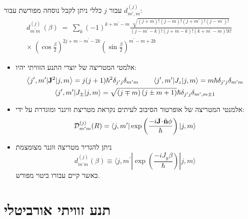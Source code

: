 \documentclass{tstextbook}
\begin{document}
\begin{proposition}
עבור \(j\) כללי ניתן לקבל נוסחה מפורשת עבור \(d^{(j)}_{m',m}\):
\begin{gather*}d_{m^{\prime}m}^{(j)}\,\left( \beta \right)\;=\;\sum_{k}(-1)^{k+m^{\prime}-m}\frac{\sqrt{(j+m)!(j-m)!\left( j+m^{\prime} \right)!\left( j-m^{\prime} \right)!}}{\left( j-m^{\prime}-k \right)!(j+m-k)!\left( k+m^{\prime}-m \right)!k!}\\ \times\;\left(\cos\frac{\beta}{2}\right)^{2j+m-m^{\prime}-2k}\left(\sin\frac{\beta}{2}\right)^{m^{\prime}-m+2k} 
\end{gather*}

\end{proposition}
\begin{summary}
  \begin{itemize}
    \item אלמטי המטריצה של יוצרי התנע הזוויתי יהיו:
\begin{gather*}\left\langle  j^{\prime},m^{\prime}|{\bf J}^{2}|j,m \right\rangle=j(j+1)\hbar^{2}\delta_{j^{\prime}j}\delta_{m^{\prime}m}\qquad  \left\langle  j^{\prime},m^{\prime}|J_{z}|j,m \right\rangle=m\hbar\delta_{j^{\prime}j}\delta_{m^{\prime}m}\\ \left\langle  j^{\prime},m^{\prime}|J_{\pm}|j,m \right\rangle=\sqrt{\left( j\mp m \right)\left( j\pm m+1 \right)}\hbar\delta_{j^{\prime}j}\delta_{m^{\prime},m\pm1} 
\end{gather*}
    \item אלמנטי המטריצה של אופרטור הסיבוב לעיתים נקראת מטריצת וויגנר ומוגדרת על ידי:
$${\mathcal{D}}_{m^{\prime}m}^{(j)}(R)=\langle j,m^{\prime}|\exp\left(\frac{-i{\bf J}\!\cdot\!{\hat{\bf n}}\phi}{\hbar}\right)|j,m\rangle$$
    \item ניתן להגדיר מטריצה ווגנר מצומצמת
$$d_{m^{\prime}m}^{(j)}(\beta)\equiv\langle j,m^{\prime}|\exp\left(\frac{-i J_{y}\beta}{\hbar}\right)|j,m\rangle$$
כאשר קיים עבורו ביטוי מפורש.
  \end{itemize}
\end{summary}
\section{תנע זוויתי אורביטלי}
\end{document}
